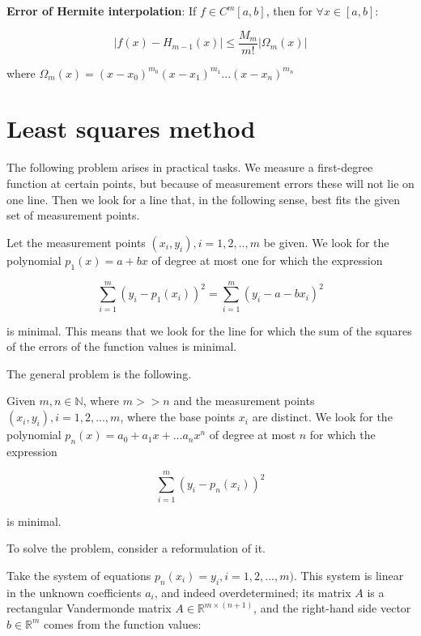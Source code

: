\documentclass[margin=0px]{article}
\begin{document}
\noindent \textbf{Error of Hermite interpolation}: If $f \in C^{m}[a,b]$, then for $\forall x \in [a,b]:$

\begin{displaymath}
    |f(x) - H_{m-1}(x)| \leq \frac{M_{m}}{m!}|\Omega_{m}(x)|
\end{displaymath}

\noindent where $\Omega_{m}(x) = (x-x_{0})^{m_{0}}(x-x_{1})^{m_{1}}...(x-x_{n})^{m_{n}}$

\section{Least squares method}

The following problem arises in practical tasks. We measure a first-degree function at certain points, but
because of measurement errors these will not lie on one line. Then we look for a line that, in the following
sense, best fits the given set of measurement points.

Let the measurement points $(x_{i},y_{i}), i=1,2,..,m$ be given. We look for the polynomial $p_{1}(x) = a + bx$ of degree at most
one for which the expression

\begin{displaymath}
    \displaystyle\sum_{i=1}^{m}(y_{i}-p_{1}(x_{i}))^{2} =
    \displaystyle\sum_{i=1}^{m}(y_{i}- a - bx_{i})^{2}
\end{displaymath}

\noindent is minimal. This means that we look for the line for which the sum of the squares of the errors of the function values
is minimal.

The general problem is the following.

Given $m,n \in \mathbb{N}$, where $m >> n$ and the measurement points $(x_{i},y_{i}), i= 1,2,...,m$, where the
base points $x_{i}$ are distinct. We look for the polynomial $p_{n}(x) = a_{0} + a_{1}x + ... a_{n}x^{n}$ of degree at most $n$
for which the expression

\begin{displaymath}
    \displaystyle\sum_{i=1}^{m}(y_{i}-p_{n}(x_{i}))^{2}
\end{displaymath}

\noindent is minimal.

To solve the problem, consider a reformulation of it.

Take the system of equations $p_{n}(x_{i}) = y_{i}, i=1,2,...,m)$. This system is linear in the unknown coefficients $a_{i}$,
and indeed overdetermined; its matrix $A$ is a rectangular Vandermonde matrix $A \in \mathbb{R}^{m \times (n+1)}$,
and the right-hand side vector $b \in \mathbb{R}^{m}$ comes from the function values:
\end{document}
